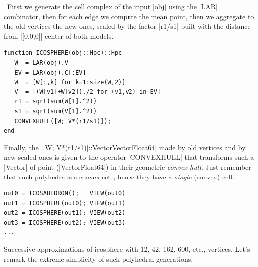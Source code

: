 \begin{coding}\
First we generate the cell complex of the input |obj| using the |LAR| combinator, then for each edge we compute the mean point, then we aggregate to the old vertices the new ones, scaled by the factor |r1/s1| built with the distance from |[0,0,0]| center of both models.
\begin{lstlisting}[language=JuliaLocal, style=julia, mathescape=true]
function ICOSPHERE(obj::Hpc)::Hpc
   W  = LAR(obj).V
   EV = LAR(obj).C[:EV]
   W  = [W[:,k] for k=1:size(W,2)]
   V  = [(W[v1]+W[v2])./2 for (v1,v2) in EV]
   r1 = sqrt(sum(W[1].^2))
   s1 = sqrt(sum(V[1].^2))
   CONVEXHULL([W; V*(r1/s1)]);
end
\end{lstlisting}
Finally, the |[W; V*(r1/s1)]::Vector{Vector{Float64}}| made by old vertices and by new scaled ones is given to the operator |CONVEXHULL| that transforms such a |Vector| of point (|Vector{Float64}|) in their geometric \emph{convex hull}.
Just remember that such polyhedra are convex sets, hence they have a \emph{single} (convex) cell. \begin{lstlisting}[language=JuliaLocal, style=julia, mathescape=true]
out0 = ICOSAHEDRON();   VIEW(out0)
out1 = ICOSPHERE(out0); VIEW(out1)
out2 = ICOSPHERE(out1); VIEW(out2)
out3 = ICOSPHERE(out2); VIEW(out3)
...		
\end{lstlisting}
Successive approximations of icosphere with 12, 42, 162, 600, etc., vertices.
Let’s remark the extreme simplicity of such polyhedral generations.
\end{coding}

